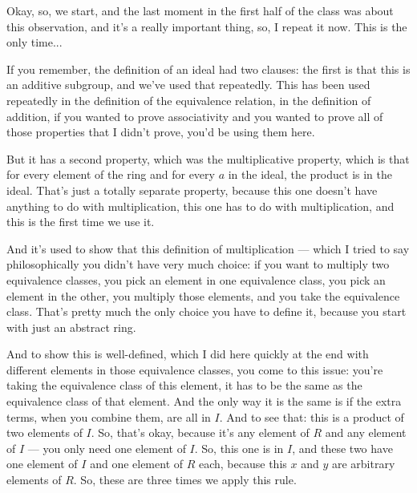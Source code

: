 \begin{speech}[00:45:11 - 00:47:25]
Okay, so, we start, and the last moment in the first half of the class was about this observation, and it's a really important thing, so, I repeat it now. This is the only time... 

If you remember, the definition of an ideal  had two clauses: the first is that  this is an additive subgroup, and we've used that repeatedly. This has been used repeatedly in the definition of the equivalence relation, in the definition of addition, if you wanted to prove associativity and you wanted to prove all of those properties that I didn't prove, you'd be using them here. 

But it has a second property, which was the multiplicative property, which is that for every element of the ring and for every $a$ in the ideal, the product is in the ideal.  That's just a totally separate property, because this one doesn't have anything to do with multiplication, this one has to do with multiplication, and this is the first time we use it. 

And it's used to show that this definition of multiplication --- which I tried to say philosophically you didn't have very much choice: if you want to multiply two equivalence classes, you pick an element in one equivalence class, you pick an element in the other, you multiply those elements, and you take the equivalence class. That's pretty much the only choice you have to define it, because you start with just an abstract ring. 

And to show this is well-defined, which I did here quickly at the end with different elements in those equivalence classes, you come to this issue: you're taking the equivalence class of this element, it has to be the same as the equivalence class of that element. And the only way it is the same is if the extra terms, when you combine them, are all in $I$. And to see that: this is a product of two elements of $I$. So, that's okay, because it's any element of $R$ and any element of $I$ --- you only need one element of $I$. So, this one is in $I$, and these two have one element of $I$ and one element of $R$ each, because this $x$ and $y$ are arbitrary elements of $R$. So, these are three times we apply this rule.
\end{speech}

